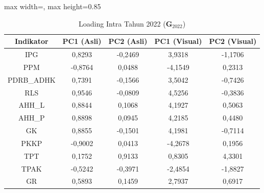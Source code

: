 \begin{table}[H]
\centering
\caption{Loading Intra Tahun 2022 ($\mathbf{G}_{2022}$)} \label{tab:app1loading_intra_2022}
\begin{adjustbox}{max width=\textwidth, max height=0.85\textheight}
\begin{tabular}{|c|c|c|c|c|}
\hline
\textbf{Indikator} & \textbf{PC1 (Asli)} & \textbf{PC2 (Asli)} & \textbf{PC1 (Visual)} & \textbf{PC2 (Visual)} \\
\hline
IPG & 0,8293 & -0,2469 & 3,9318 & -1,1706 \\
PPM & -0,8764 & 0,0488 & -4,1549 & 0,2313 \\
PDRB\_ADHK & 0,7391 & -0,1566 & 3,5042 & -0,7426 \\
RLS & 0,9546 & -0,0809 & 4,5256 & -0,3836 \\
AHH\_L & 0,8844 & 0,1068 & 4,1927 & 0,5063 \\
AHH\_P & 0,8898 & 0,0945 & 4,2185 & 0,4480 \\
GK & 0,8855 & -0,1501 & 4,1981 & -0,7114 \\
PKKP & -0,9002 & 0,0413 & -4,2678 & 0,1956 \\
TPT & 0,1752 & 0,9133 & 0,8305 & 4,3301 \\
TPAK & -0,5242 & -0,3971 & -2,4854 & -1,8827 \\
GR & 0,5893 & 0,1459 & 2,7937 & 0,6917 \\
\hline
\end{tabular}
\end{adjustbox}
\end{table}